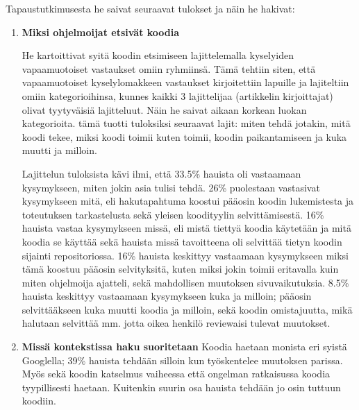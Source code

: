 \documentclass[finnish]{../tktltiki2}
\theoremstyle{definition}
\theoremstyle{remark}
\begin{document}
Tapaustutkimusesta he saivat seuraavat tulokset ja näin he hakivat:
\begin{enumerate}

  \item {\bf Miksi ohjelmoijat etsivät koodia}

    He kartoittivat syitä koodin etsimiseen lajittelemalla kyselyiden vapaamuotoiset vastaukset omiin ryhmiinsä. Tämä tehtiin siten, että vapaamuotoiset kyselylomakkeen vastaukset kirjoitettiin lapuille ja lajiteltiin omiin kategorioihinsa, kunnes kaikki 3 lajittelijaa (artikkelin kirjoittajat) olivat tyytyväisiä lajitteluut. Näin he saivat aikaan korkean luokan kategorioita.
    tämä tuotti tuloksiksi seuraavat lajit: miten tehdä jotakin, mitä koodi tekee, miksi koodi toimii kuten toimii, koodin paikantamiseen ja kuka muutti ja milloin.

  Lajittelun tuloksista kävi ilmi, että 33.5\% hauista oli vastaamaan kysymykseen, miten jokin asia tulisi tehdä. 26\% puolestaan vastasivat kysymykseen mitä, eli hakutapahtuma koostui pääosin koodin lukemistesta ja toteutuksen tarkastelusta sekä yleisen koodityylin selvittämisestä. 16\% hauista vastaa kysymykseen missä, eli mistä tiettyä koodia käytetään ja mitä koodia se käyttää sekä hauista missä tavoitteena oli selvittää tietyn koodin sijainti repositoriossa. 16\% hauista keskittyy vastaamaan kysymykseen miksi tämä koostuu pääosin selvityksitä, kuten miksi jokin toimii eritavalla kuin miten ohjelmoija ajatteli, sekä mahdollisen muutoksen sivuvaikutuksia. 8.5\% hauista keskittyy vastaamaan kysymykseen kuka ja milloin; pääosin selvittääkseen kuka muutti koodia ja milloin, sekä koodin omistajuutta, mikä halutaan selvittää mm. jotta oikea henkilö reviewaisi tulevat muutokset.




  \item {\bf Missä kontekstissa haku suoritetaan}
    Koodia haetaan monista eri syistä Googlella; 39\% hauista tehdään silloin kun työskentelee muutoksen parissa. Myös sekä koodin katselmus vaiheessa että ongelman ratkaisussa koodia tyypillisesti haetaan. Kuitenkin suurin osa hauista tehdään jo osin tuttuun koodiin.
\end{enumerate}



%
%
% 
%







%
\end{document}
